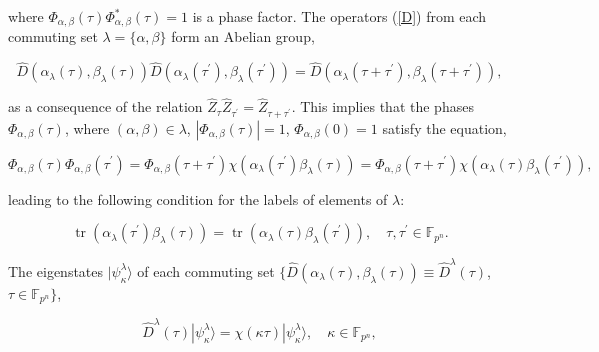 \documentclass[quantumrep,article,submit,pdftex,moreauthors]{Definitions/mdpi}
\DeclareMathOperator{\tr}{tr}
\begin{document}
where $\Phi_{\alpha ,\beta }\left( \tau \right) \Phi _{\alpha ,\beta }^{\ast
}\left( \tau \right) =1$ is a phase factor. The operators (\ref{D}) from each
commuting set $\lambda =\{\alpha,\beta\}$ form an Abelian group,

\begin{equation}
\hat{D}\left(
  \alpha_{\lambda}(\tau),\beta_{\lambda }(\tau)
\right)
\hat{D}\left(
  \alpha_{\lambda}(\tau^{\prime }),\beta_{\lambda }(\tau^{\prime })
\right)
= \hat{D}\left(\alpha_{\lambda}(\tau + \tau^{\prime}), \beta_{\lambda}(\tau +
\tau^{\prime })\right),
\label{DD}
\end{equation}

as a consequence of the relation $\hat{Z}_{\tau }\hat{Z}_{\tau ^{\prime }}=
\hat{Z}_{\tau +\tau ^{\prime }}$. This implies that the phases $\Phi
_{\alpha,\beta }\left( \tau \right) $, where $(\alpha ,\beta )\in \lambda $,
$|\Phi _{\alpha ,\beta }\left( \tau \right) |=1$,
$\Phi_{\alpha,\beta}\left(0\right) = 1$ satisfy the equation, 

\begin{equation}
  \Phi_{\alpha,\beta }\left( \tau \right)
  \Phi_{\alpha,\beta }\left( \tau^{\prime}\right)
  = \Phi_{\alpha,\beta }\left( \tau +\tau^{\prime }\right)
  \chi \left(\alpha _{\lambda}(\tau^{\prime})\beta_{\lambda}(\tau)\right)
  = \Phi_{\alpha,\beta}\left(\tau + \tau^{\prime}\right)
  \chi\left(\alpha_{\lambda}(\tau)\beta_{\lambda}(\tau^{\prime })\right),
  \label{Phi}
\end{equation}

leading to the following condition for the labels of elements of $\lambda$: 

\begin{equation}
  \tr\left(\alpha_{\lambda}(\tau^{\prime })\beta_{\lambda }(\tau)\right)
  = \tr\left(\alpha_{\lambda}(\tau)\beta_{\lambda }(\tau^{\prime })\right),
  \quad \tau,\tau^{\prime} \in \mathbb{F}_{p^{n}}. 
  \label{CC}
\end{equation}

The eigenstates $|\psi_\kappa^\lambda\rangle$ of each commuting set
$\{\hat{D}\left(\alpha_{\lambda}(\tau),\beta_{\lambda}(\tau)\right) \equiv
\hat{D}^{\lambda}(\tau)$, $\tau \in \mathbb{F}_{p^{n}}\}$,

\begin{equation}
  \hat{D}^{\lambda}(\tau) |\psi_{\kappa}^{\lambda}\rangle
  = \chi(\kappa \tau) |\psi_{\kappa}^{\lambda }\rangle,
  \quad \kappa \in \mathbb{F}_{p^{n}},
  \label{states}
\end{equation}
\end{document}
